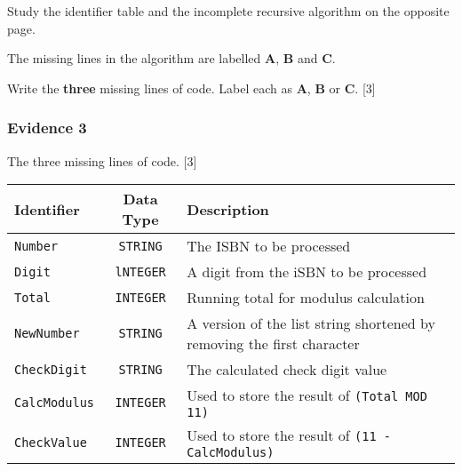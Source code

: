 Study the identifier table and the incomplete recursive algorithm
on the opposite page. 

The missing lines in the algorithm are labelled \textbf{A}, \textbf{B}
and \textbf{C}. 

Write the\textbf{ three} missing lines of code. Label each as \textbf{A},
\textbf{B} or \textbf{C}. \hfill{} {[}3{]}

\subsubsection*{Evidence 3}

The three missing lines of code. \hfill{}{[}3{]}
\begin{center}
\begin{tabular}{|l|c|l|}
\hline 
\textbf{Identifier} & \textbf{Data Type} & \textbf{Description}\tabularnewline
\hline 
\texttt{Number} & \texttt{STRING} & The ISBN to be processed\tabularnewline
\hline 
\texttt{Digit} & \texttt{lNTEGER} & A digit from the iSBN to be processed\tabularnewline
\hline 
\texttt{Total} & \texttt{INTEGER} & Running total for modulus calculation\tabularnewline
\hline 
\texttt{NewNumber} & \texttt{STRING} & A version of the list string shortened by removing the first character\tabularnewline
\hline 
\texttt{CheckDigit} & \texttt{STRING} & The calculated check digit value\tabularnewline
\hline 
\texttt{CalcModulus} & \texttt{INTEGER} & Used to store the result of \texttt{(Total MOD 11)}\tabularnewline
\hline 
\texttt{CheckValue} & \texttt{INTEGER} & Used to store the result of \texttt{(11 - CalcModulus)}\tabularnewline
\hline 
\end{tabular}
\par\end{center}

